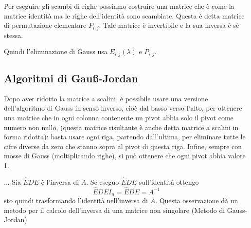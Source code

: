 \documentclass[a4paper]{article}
\begin{document}
Per eseguire gli scambi di righe possiamo costruire una matrice che è come la matrice
identità ma le righe dell'identità sono scambiate.
Questa è detta matrice di permutazione elementare \(P_{i,j}\).
Tale matrice è invertibile e la sua inversa è sè stessa.

Quindi l'eliminazione di Gauss usa \(E_{i,j}(\lambda)\) e \(P_{i,j}\).

\subsection{Algoritmi di Gauß-Jordan}

Dopo aver ridotto la matrice a scalini, è possibile usare una versione dell'algoritmo di
Gauss in senso inverso, cioè dal basso verso l'alto,
per ottenere una matrice che in ogni colonna contenente un pivot abbia solo il pivot come
numero non nullo, (questa matrice risultante è anche detta matrice a scalini in forma ridotta):
basta usare ogni riga, partendo dall'ultima, per eliminare tutte le
cifre diverse da zero che stanno sopra al pivot di questa riga.
Infine, sempre con mosse di Gauss (moltiplicando righe),
si può ottenere che ogni pivot abbia valore 1.

... Sia \(\hat{E}DE\) è l'inversa di \(A\). Se eseguo \(\hat{E}DE\) sull'identità ottengo
\[
    \hat{E}DEI_n = \hat{E}DE = A^{-1}
\]
sto quindi trasformando l'identità nell'inversa di \(A\).
Questa osservazione dà un metodo per il calcolo dell'inversa di una matrice non singolare
(Metodo di Gauss-Jordan)


\end{document}
